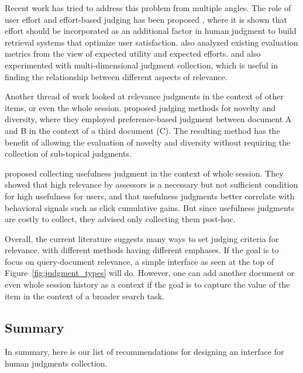 
Recent work has tried to address this problem from multiple angles. The role of user effort and effort-based judging has been proposed \citep{Yilmaz:2014,VermaYC16}, where it is shown that effort should be incorporated as an additional factor in human judgment to build retrieval systems that optimize user satisfaction. \cite{Carterette:2011:SEU} also analyzed existing evaluation metrics from the view of expected utility and expected efforts. \cite{Golbus:2014:CDR} and \cite{Kim:2013} also experimented with multi-dimensional judgment collection, which is useful in finding the relationship between different aspects of relevance. 

Another thread of work looked at relevance judgments in the context of other items, or even the whole session. \cite{Chandar2013} proposed judging methods for novelty and diversity, where they employed preference-based judgment between document A and B in the context of a third document (C). The resulting method has the benefit of allowing the evaluation of novelty and diversity without requiring the collection of sub-topical judgments. 

\cite{Mao:2016} proposed collecting usefulness judgment in the context of whole session. They showed that high relevance by assessors is a necessary but not sufficient condition for high usefulness for users, and that usefulness judgments better correlate with behavioral signals such as click cumulative gains. But since usefulness judgments are costly to collect, they advised only collecting them post-hoc.

Overall, the current literature suggests many ways to set judging criteria for relevance, with different methods having different emphases. If the goal is to focus on query-document relevance, a simple interface as seen at the top of Figure~\ref{fig:judgment_types} will do. However, one can add another document or even whole session history as a context if the goal is to capture the value of the item in the context of a broader search task. 


\subsection{Summary}
In summary, here is our list of recommendations for designing an interface for human judgments collection.

